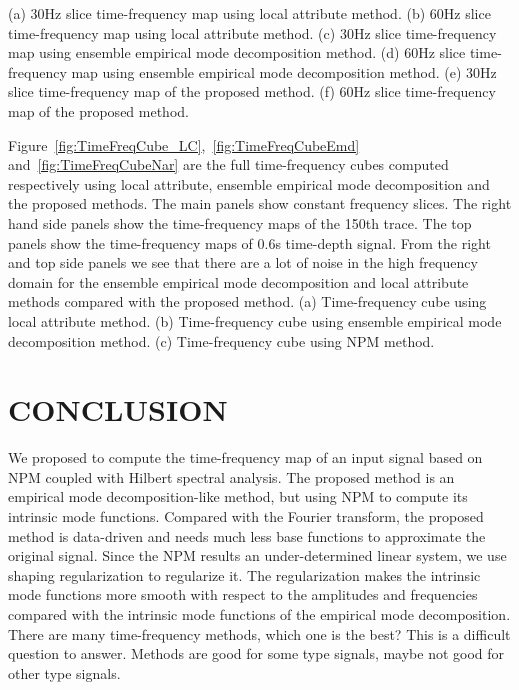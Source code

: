 {
   (a) 30Hz slice time-frequency map using local attribute method.
   (b) 60Hz slice time-frequency map using local attribute method.
   (c) 30Hz slice time-frequency map using ensemble empirical mode decomposition method.
   (d) 60Hz slice time-frequency map using ensemble empirical mode decomposition method.
   (e) 30Hz slice time-frequency map of the proposed method. 
   (f) 60Hz slice time-frequency map of the proposed method. 
}

Figure~\ref{fig:TimeFreqCube_LC},~\ref{fig:TimeFreqCubeEmd} and~\ref{fig:TimeFreqCubeNar} are the 
full time-frequency cubes computed respectively using local attribute, ensemble empirical mode decomposition and the proposed 
methods. The main panels show constant frequency slices. 
The right hand side panels show the time-frequency maps of the 150th trace. 
The top panels show the time-frequency maps of 0.6s time-depth signal. 
From the right and top side panels we see that there are a lot of noise in the high 
frequency domain for the ensemble empirical mode decomposition and local attribute methods compared with the proposed method. 
{
   (a) Time-frequency cube using local attribute method. 
   (b) Time-frequency cube using ensemble empirical mode decomposition method. 
   (c) Time-frequency cube using NPM method. 
}

\section{CONCLUSION}
We proposed to compute the time-frequency map of an input signal based on 
NPM coupled with Hilbert spectral analysis. 
The proposed method is an empirical mode decomposition-like method, but using NPM 
to compute its intrinsic mode functions. Compared with the Fourier 
transform, the proposed method is data-driven and needs much less base functions 
to approximate the original signal. Since the NPM 
results an under-determined linear system, we use shaping regularization to 
regularize it. The regularization makes the intrinsic mode functions more 
smooth with respect to the amplitudes and frequencies 
compared with the intrinsic mode functions of the empirical mode decomposition. 
There are many time-frequency methods, which one is the best? This is a difficult 
question to answer. Methods are good for some type signals, maybe not good for 
other type signals.  

